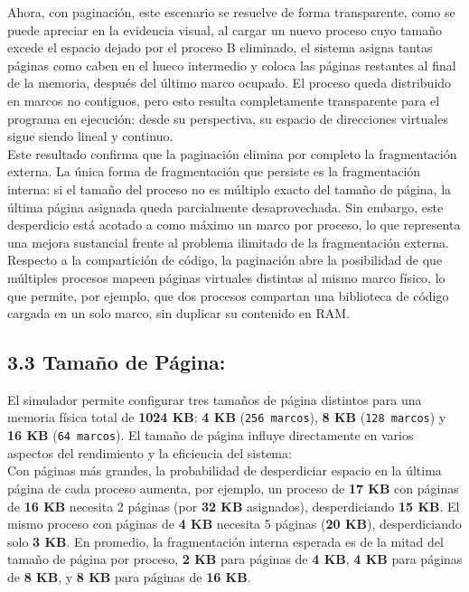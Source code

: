 \documentclass[12pt,letterpaper]{article}
\begin{document}
Ahora, con paginación, este escenario se resuelve de forma transparente, como se puede apreciar en la evidencia
visual, al cargar un nuevo proceso cuyo tamaño excede el espacio dejado por el proceso B eliminado, el sistema
asigna tantas páginas como caben en el hueco intermedio y coloca las páginas restantes al final de la memoria,
después del último marco ocupado. El proceso queda distribuido en marcos no contiguos, pero esto resulta
completamente transparente para el programa en ejecución: desde su perspectiva, su espacio de direcciones
virtuales sigue siendo lineal y continuo.\\

Este resultado confirma que la paginación elimina por completo la fragmentación externa. La única forma de
fragmentación que persiste es la fragmentación interna: si el tamaño del proceso no es múltiplo exacto del tamaño
de página, la última página asignada queda parcialmente desaprovechada. Sin embargo, este desperdicio está
acotado a como máximo un marco por proceso, lo que representa una mejora sustancial frente al problema ilimitado
de la fragmentación externa.\\

Respecto a la compartición de código, la paginación abre la posibilidad de que múltiples procesos mapeen páginas
virtuales distintas al mismo marco físico, lo que permite, por ejemplo, que dos procesos compartan una biblioteca
de código cargada en un solo marco, sin duplicar su contenido en RAM.

\subsection*{3.3 Tamaño de Página:}
El simulador permite configurar tres tamaños de página distintos para una memoria física total de
\textbf{1024 KB}: \textbf{4 KB} (\texttt{256 marcos}), \textbf{8 KB} (\texttt{128 marcos}) y \textbf{16 KB}
(\texttt{64 marcos}). El tamaño de página influye directamente en varios aspectos del rendimiento y la
eficiencia del sistema:\\

Con páginas más grandes, la probabilidad de desperdiciar espacio en la última página de cada proceso aumenta, por
ejemplo, un proceso de \textbf{17 KB} con páginas de \textbf{16 KB} necesita 2 páginas (por \textbf{32 KB}
asignados), desperdiciando \textbf{15 KB}. El mismo proceso con páginas de \textbf{4 KB} necesita 5 páginas
(\textbf{20 KB}), desperdiciando solo \textbf{3 KB}. En promedio, la fragmentación interna esperada es de la
mitad del tamaño de página por proceso, \textbf{2 KB} para páginas de \textbf{4 KB}, \textbf{4 KB} para páginas
de \textbf{8 KB}, y \textbf{8 KB} para páginas de \textbf{16 KB}.\\
\end{document}
